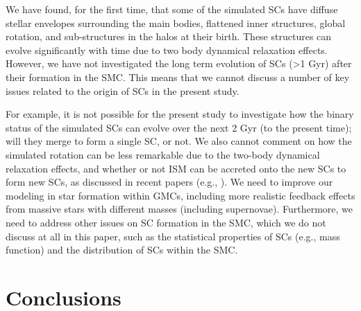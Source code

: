 \documentclass[fleqn,usenatbib]{mnras}
\begin{document}
We have found, for the first time, that some
of the simulated SCs have diffuse stellar envelopes surrounding the main bodies, flattened inner structures, global rotation, and sub-structures in the halos at their birth. These structures can evolve significantly with time due to two body dynamical relaxation effects. However, we have not investigated the long term evolution of SCs (>1 Gyr) after their formation in the SMC. This  means that we cannot discuss a number of key issues related to the origin of SCs in the present study. 


For example, it is not possible for the present study to investigate how the binary status of the simulated SCs can evolve over the next 2 Gyr (to the present time); will they merge to form a single SC, or not. We also cannot comment on how the simulated rotation can be less remarkable due to the two-body dynamical relaxation effects, and whether or not ISM can be accreted onto the new SCs to form new SCs, as discussed in recent papers (e.g., \citealt{K23_McKenzie_Bekki2021}). We need to improve our modeling in star formation within GMCs, including more realistic feedback effects from massive stars with different masses (including supernovae). Furthermore, we need to address other issues on SC formation in the SMC, which we do not discuss at all in this paper, such as the statistical properties of SCs (e.g., mass function) and the distribution of SCs within the SMC.

\section{Conclusions}
\label{sec:conclusion}
\end{document}
